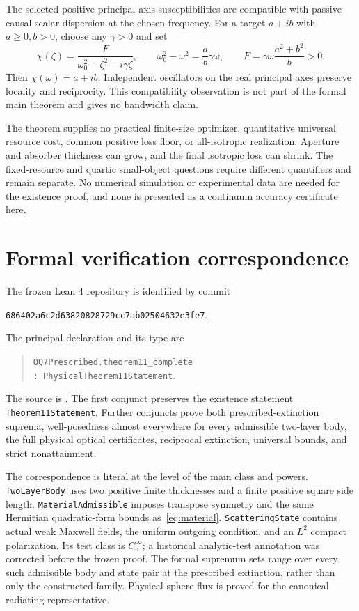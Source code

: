 \documentclass[11pt]{article}
\begin{document}
The selected positive principal-axis susceptibilities are compatible with passive causal scalar dispersion at the chosen frequency. For a target $a+ib$ with $a\geq0,b>0$, choose any $\gamma>0$ and set
\begin{equation}\label{eq:lorentz}
 \chi(\zeta)=\frac{F}{\omega_0^2-\zeta^2-i\gamma\zeta},\qquad
 \omega_0^2-\omega^2=\frac{a}{b}\gamma\omega,\qquad
 F=\gamma\omega\frac{a^2+b^2}{b}>0.
\end{equation}
Then $\chi(\omega)=a+ib$. Independent oscillators on the real principal axes preserve locality and reciprocity. This compatibility observation is not part of the formal main theorem and gives no bandwidth claim.

The theorem supplies no practical finite-size optimizer, quantitative universal resource cost, common positive loss floor, or all-isotropic realization. Aperture and absorber thickness can grow, and the final isotropic loss can shrink. The fixed-resource and quartic small-object questions require different quantifiers and remain separate. No numerical simulation or experimental data are needed for the existence proof, and none is presented as a continuum accuracy certificate here.

\section{Formal verification correspondence}\label{sec:formal}
The frozen Lean 4 repository is identified by commit
\begin{center}\small\texttt{686402a6c2d63820828729cc7ab02504632e3fe7}.\end{center}
The principal declaration and its type are
\begin{quote}
\texttt{OQ7Prescribed.theorem11\_complete}\\
\texttt{: PhysicalTheorem11Statement}.
\end{quote}
The source is . The first conjunct preserves the existence statement \texttt{Theorem11Statement}. Further conjuncts prove both prescribed-extinction suprema, well-posedness almost everywhere for every admissible two-layer body, the full physical optical certificates, reciprocal extinction, universal bounds, and strict nonattainment.

The correspondence is literal at the level of the main class and powers. \texttt{TwoLayerBody} uses two positive finite thicknesses and a finite positive square side length. \texttt{MaterialAdmissible} imposes transpose symmetry and the same Hermitian quadratic-form bounds as~\eqref{eq:material}. \texttt{ScatteringState} contains actual weak Maxwell fields, the uniform outgoing condition, and an $L^2$ compact polarization. Its test class is $C_c^\infty$; a historical analytic-test annotation was corrected before the frozen proof. The formal supremum sets range over every such admissible body and state pair at the prescribed extinction, rather than only the constructed family. Physical sphere flux is proved for the canonical radiating representative.
\end{document}
